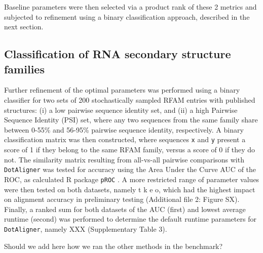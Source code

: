 \documentclass{bmcart}
\newcommand\dotaligner{\texttt{DotAligner}}
\begin{document}
Baseline parameters were then selected via a product rank of these 2 metrics 
and subjected to refinement using a binary classification approach, described in the next section. 

\subsection*{Classification of RNA secondary structure families}

Further refinement of the optimal parameters was performed using a binary classifier for two sets of 
200 stochastically sampled RFAM entries with published structures: 
(i) a low pairwise sequence identity set, and (ii) a high Pairwise Sequence Identity (PSI) set, 
where any two sequences from the same family share between 0-55\% and 56-95\% pairwise sequence identity, respectively. A binary classification matrix was then constructed, where sequences \texttt{x} and \texttt{y}
present a score of 1 if they belong to the same RFAM family, versus a score of 0 if they do not. 
The similarity matrix resulting from all-vs-all pairwise comparisons with \dotaligner{} was tested for 
accuracy using the Area Under the Curve AUC of the ROC, as calculated R package \texttt{pROC} \cite{robin2011proc}. 
A more restricted range of parameter values were then tested on both datasets, {\color{red} namely t k e o, which had the highest impact on alignment accuracy in preliminary testing (Additional file 2: Figure SX)}. Finally, a ranked sum for both datasets of the AUC (first) and lowest average runtime (second) was performed to determine the default runtime parameters for \dotaligner{}, namely XXX (Supplementary Table 3).

{\color{red} Should we add here how we ran the other methods in the benchmark?}

\end{document}
